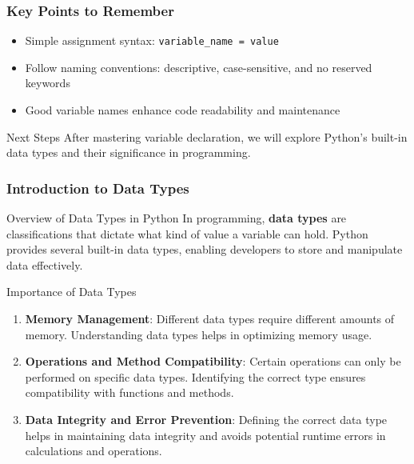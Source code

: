 \documentclass{beamer}
\begin{document}
\begin{frame}[fragile]
    \frametitle{Key Points to Remember}
    \begin{itemize}
        \item Simple assignment syntax: \texttt{variable\_name = value}
        \item Follow naming conventions: descriptive, case-sensitive, and no reserved keywords
        \item Good variable names enhance code readability and maintenance
    \end{itemize}
    \begin{block}{Next Steps}
        After mastering variable declaration, we will explore Python's built-in data types and their significance in programming.
    \end{block}
\end{frame}

\begin{frame}[fragile]
    \frametitle{Introduction to Data Types}
    
    \begin{block}{Overview of Data Types in Python}
        In programming, \textbf{data types} are classifications that dictate what kind of value a variable can hold. Python provides several built-in data types, enabling developers to store and manipulate data effectively.
    \end{block}
    
    \begin{block}{Importance of Data Types}
        \begin{enumerate}
            \item \textbf{Memory Management}: Different data types require different amounts of memory. Understanding data types helps in optimizing memory usage.
            \item \textbf{Operations and Method Compatibility}: Certain operations can only be performed on specific data types. Identifying the correct type ensures compatibility with functions and methods.
            \item \textbf{Data Integrity and Error Prevention}: Defining the correct data type helps in maintaining data integrity and avoids potential runtime errors in calculations and operations.
        \end{enumerate}
    \end{block}
\end{frame}
\end{document}
